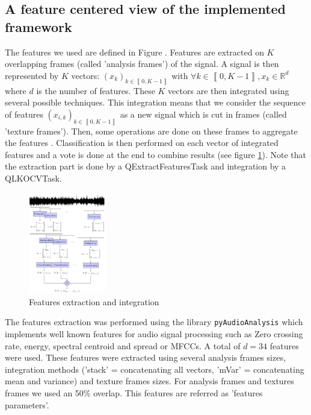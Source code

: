 \documentclass[10pt, conference, compsocconf]{IEEEtran}
\newcommand{\iseg}[1]{{\left\llbracket #1 \right\rrbracket}} %
\newcommand{\rset}{\mathbb{R}}
\begin{document}
\subsection{A feature centered view of the implemented framework} \label{subsec:extraction}
The features we used are defined in Figure \cite{pyAudioAnalysis}. 
Features are extracted on $K$ overlapping frames (called 'analysis frames') of the signal. A signal is then represented by $K$ vectors: $(x_k)_{k \in \iseg{0,K-1}}$ with $\forall k \in \iseg{0, K-1}, x_k \in \rset^d$ where $d$ is the number of features. These $K$ vectors are then integrated using several possible techniques. This integration means that we consider the sequence of features  $\left(x_{i,k}\right)_{k \in \iseg{0,K-1}}$ as a new signal which is cut in frames (called 'texture frames'). Then, some operations are done on these frames to aggregate the features \cite{DBLP:journals/taslp/JoderER09}. Classification is then performed on each vector of integrated features and a vote is done at the end to combine results (see figure \ref{fig:integration}). Note that the extraction part is done by a QExtractFeaturesTask and integration by a QLKOCVTask.
\begin{figure}[h]
  \captionsetup{belowskip=-10pt}
  \begin{center}
    \includegraphics[width=0.3\textwidth]{Figures/integration.pdf}
  \end{center}
  \caption{Features extraction and integration \label{fig:integration}} 
\end{figure}

The features extraction was performed using the library \texttt{pyAudioAnalysis} \cite{pyAudioAnalysis} which implements well known features for audio signal processing such as Zero crossing rate, energy, spectral centroid and spread or MFCCs. A total of $d=34$ features were used. These features were extracted using several analysis frames sizes, integration methods ('stack' = concatenating all vectors, 'mVar' = concatenating mean and variance) and texture frames sizes. For analysis frames and textures frames we used an 50\% overlap. This features are referred as 'features parameters'. 
\end{document}

